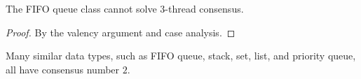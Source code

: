 \begin{frame}{}
  \begin{theorem}
    The FIFO queue class cannot solve $3$-thread consensus.
  \end{theorem}

  \vspace{0.30cm}
  \begin{proof}
    By the valency argument and case analysis.
  \end{proof}
\end{frame}

\begin{frame}{}
  \begin{theorem}
    Many similar data types, such as FIFO queue, stack, set, list, and priority queue,
    all have consensus number $2$.
  \end{theorem}

  \pause
  \vspace{0.50cm}
  \begin{theorem}

  \end{theorem}
\end{frame}

\begin{frame}{}
\end{frame}

\begin{frame}{}
\end{frame}

\begin{frame}{}
\end{frame}
